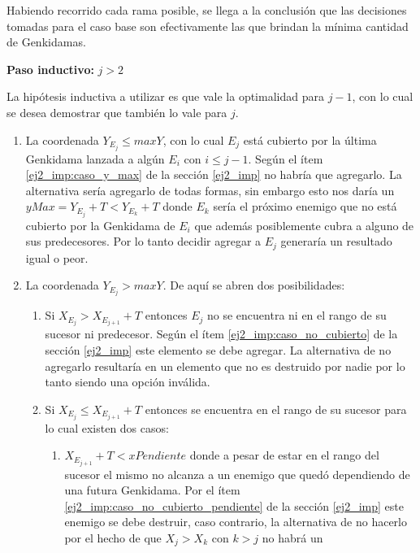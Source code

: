 \begin{enumerate}
{			Habiendo recorrido cada rama posible, se llega a la conclusión
			que las decisiones tomadas para el caso base son efectivamente
			las que brindan la mínima cantidad de Genkidamas.

			\textbf{Paso inductivo:} $j > 2$

			La hipótesis inductiva a utilizar es que vale la optimalidad para
			$j - 1$, con lo cual se desea demostrar que también lo vale para
			$j$.

			\begin{enumerate}
				\item{
					La coordenada $Y_{E_j} \leq maxY$, con lo cual $E_j$ está
					cubierto por la última Genkidama lanzada a algún $E_i$ con
					$i \leq j - 1$. Según el ítem \ref{ej2_imp:caso_y_max} de la
					sección \ref{ej2_imp} no habría que agregarlo. La
					alternativa sería agregarlo de todas formas, sin embargo
					esto nos daría un $yMax = Y_{E_j} + T < Y_{E_k} + T$ donde
					$E_k$ sería el próximo enemigo que no está cubierto por la
					Genkidama de $E_i$ que además posiblemente cubra a alguno de
					sus predecesores. Por lo tanto decidir agregar a $E_j$
					generaría un resultado igual o peor.
				}
				\item{
					La coordenada $Y_{E_j} > maxY$. De aquí se abren dos
					posibilidades:
					\begin{enumerate}
						\item{
							Si $X_{E_j} > X_{E_{j+1}} + T$ entonces $E_j$ no se
							encuentra ni en el rango de su sucesor ni
							predecesor. Según el ítem
							\ref{ej2_imp:caso_no_cubierto} de la sección
							\ref{ej2_imp} este elemento se debe agregar. La
							alternativa de no agregarlo resultaría en un
							elemento que no es destruido por nadie por lo tanto
							siendo una opción inválida.
						}
						\item{
							Si $X_{E_j} \leq X_{E_{j+1}} + T$ entonces se
							encuentra en el rango de su sucesor para lo cual
							existen dos casos:
							\begin{enumerate}
								\item{
									$X_{E_{j+1}} + T < xPendiente$ donde a pesar
									de estar en el rango del sucesor el mismo no
									alcanza a un enemigo que quedó dependiendo
									de una futura Genkidama. Por el ítem
									\ref{ej2_imp:caso_no_cubierto_pendiente} de
									la sección \ref{ej2_imp} este enemigo se
									debe destruir, caso contrario, la
									alternativa de no hacerlo por el hecho de
									que $X_j > X_k$ con $k > j$ no habrá un
}
\end{enumerate}}
\end{enumerate}}
\end{enumerate}}
\end{enumerate}
